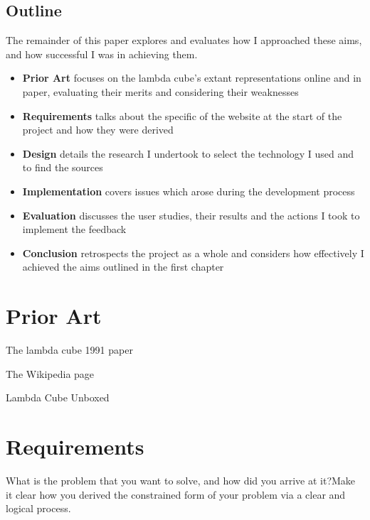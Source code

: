 \documentclass{l4proj}
\begin{document}
\section{Outline}

The remainder of this paper explores and evaluates how I approached these aims, and how successful I was in achieving them.

\begin{itemize}
    \item
    \textbf{Prior Art} focuses on the lambda cube's extant representations online and in paper,  evaluating their merits and considering their weaknesses
    \item
    \textbf{Requirements} talks about the specific  of the website at the start of the project and how they were derived
    \item
    \textbf{Design} details the research I undertook to select the technology I used and to find the sources
    \item
    \textbf{Implementation} covers issues which arose during the development process
    \item
    \textbf{Evaluation} discusses the user studies, their results and the actions I took to implement the feedback
    \item
    \textbf{Conclusion} retrospects the project as a whole and considers how effectively I achieved the aims outlined in the first chapter
    
\end{itemize}

\chapter{Prior Art}

The lambda cube 1991 paper

The Wikipedia page

Lambda Cube Unboxed



\chapter{Requirements}
What is the problem that you want to solve, and how did you arrive at it?Make it clear how you derived the constrained form of your problem via a clear and logical process. 
\end{document}
